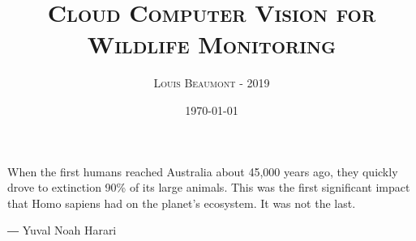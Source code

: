 \documentclass[a4paper,11pt]{report}
\title{\textsc{Cloud Computer Vision for Wildlife Monitoring}}
\author{\textsc{Louis} \textsc{Beaumont} - \textsc{2019}}
\date{\today}
\begin{document}

\chapter*{} %
When the first humans reached Australia about 45,000 years ago, they quickly drove to extinction 90\% of its large animals. This was the first significant impact that Homo sapiens had on the planet's ecosystem. It was not the last.


― Yuval Noah Harari





\tableofcontents


\listoffigures %





 








\end{document}
